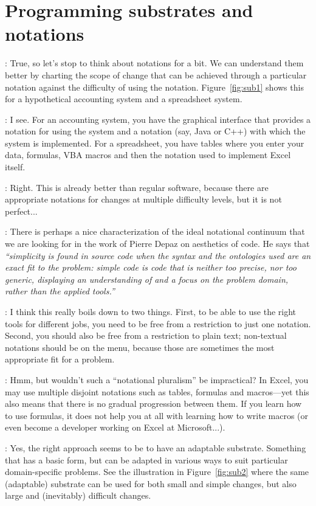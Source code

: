 \documentclass[runningheads]{llncs}
\newcommand{\T}{Tomas}
\newcommand{\J}{Joel}
\newcommand{\says}[2][gg]{\vspace{0.5em}\noindent\hangindent=0.5cm{\textsc{#1}}: #2}
\begin{document}
\section{Programming substrates and notations}

\says[\J]{True, so let's stop to think about notations for a bit. We can understand them better by charting the scope of change that can be achieved through a particular notation against the difficulty of using the notation. Figure~\ref{fig:sub1} shows this for a hypothetical accounting system and a spreadsheet system.}

\says[\T]{I see. For an accounting system, you have the graphical interface that provides a notation for using the system and a notation (say, Java or C++) with which the system is implemented. For a spreadsheet, you have tables where you enter your data, formulas, VBA macros and then the notation used to implement Excel itself.}

\says[\J]{Right. This is already better than regular software, because there are appropriate notations for changes at multiple difficulty levels, but it is not perfect...}

\says[\T]{There is perhaps a nice characterization of the ideal notational continuum that we are looking for in the work of Pierre Depaz \cite[p.123]{depaz-2023-aesthetics} on aesthetics of code. He says that \emph{``simplicity is found in source code when the syntax and the ontologies used are an exact fit to the problem: simple code is code that is neither too precise, nor too generic, displaying an understanding of and a focus on the problem domain, rather than the applied tools.''}}

\says[\J]{I think this really boils down to two things. First, to be able to use the right tools for different jobs, you need to be free from a restriction to just one notation. Second, you should also be free from a restriction to plain text; non-textual notations should be on the menu, because those are sometimes the most appropriate fit for a problem.}

\says[\T]{Hmm, but wouldn't such a ``notational pluralism'' be impractical? In Excel, you may use multiple disjoint notations such as tables, formulas and macros---yet this also means that there is no gradual progression between them. If you learn how to use formulas, it does not help you at all with learning how to write macros (or even become a developer working on Excel at Microsoft...).}

\says[\J]{Yes, the right approach seems to be to have an adaptable substrate. Something that has a basic form, but can be adapted in various ways to suit particular domain-specific problems. See the illustration in Figure~\ref{fig:sub2} where the same (adaptable) substrate can be used for both small and simple changes, but also large and (inevitably) difficult changes.}
\end{document}
